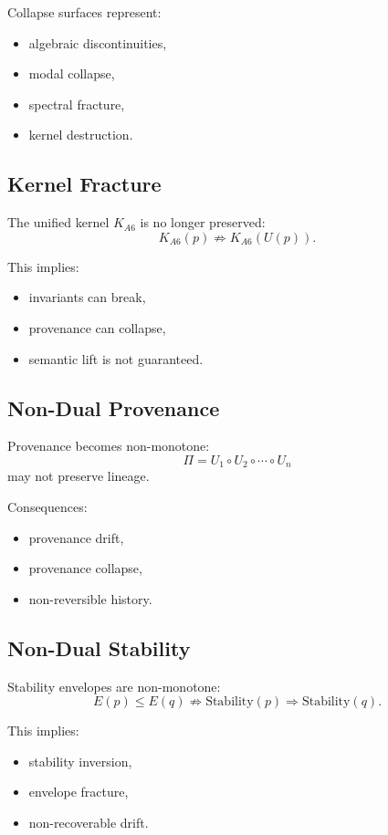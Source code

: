 Collapse surfaces represent:
\begin{itemize}
  \item algebraic discontinuities,
  \item modal collapse,
  \item spectral fracture,
  \item kernel destruction.
\end{itemize}

\subsection{Kernel Fracture}

The unified kernel $K_{A6}$ is no longer preserved:
\[
K_{A6}(p) \not\Rightarrow K_{A6}(U(p)).
\]

This implies:
\begin{itemize}
  \item invariants can break,
  \item provenance can collapse,
  \item semantic lift is not guaranteed.
\end{itemize}

\subsection{Non-Dual Provenance}

Provenance becomes non-monotone:
\[
\Pi = U_1 \circ U_2 \circ \cdots \circ U_n
\]
may not preserve lineage.

Consequences:
\begin{itemize}
  \item provenance drift,
  \item provenance collapse,
  \item non-reversible history.
\end{itemize}

\subsection{Non-Dual Stability}

Stability envelopes are non-monotone:
\[
E(p) \le E(q) \not\Rightarrow \text{Stability}(p) \Rightarrow \text{Stability}(q).
\]

This implies:
\begin{itemize}
  \item stability inversion,
  \item envelope fracture,
  \item non-recoverable drift.
\end{itemize}

